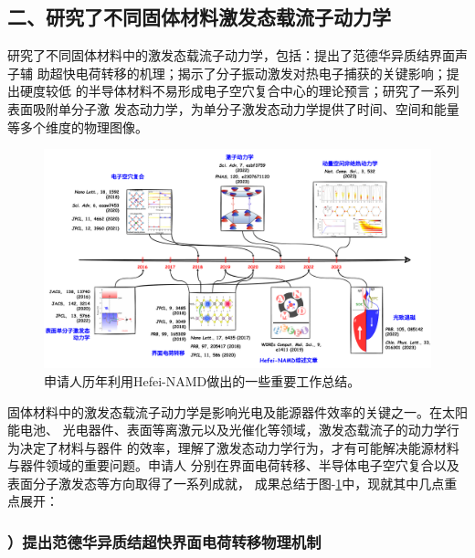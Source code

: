 \subsection*{二、研究了不同固体材料激发态载流子动力学}
\begin{center}
  \begin{InnovationBox}
    研究了不同固体材料中的激发态载流子动力学，包括：提出了范德华异质结界面声子辅
    助超快电荷转移的机理；揭示了分子振动激发对热电子捕获的关键影响；提出硬度较低
    的半导体材料不易形成电子空穴复合中心的理论预言；研究了一系列表面吸附单分子激
    发态动力学，为单分子激发态动力学提供了时间、空间和能量等多个维度的物理图像。
  \end{InnovationBox}
\end{center}

\begin{figure}
  \centering
  \includegraphics[width=1.\linewidth]{figs/rep_work.pdf}
  \caption{\label{fig:fig_rep_work}
    \kaishu{}\footnotesize
    申请人历年利用Hefei-NAMD做出的一些重要工作总结。
  }
\end{figure}


固体材料中的激发态载流子动力学是影响光电及能源器件效率的关键之一。在太阳能电池、
光电器件、表面等离激元以及光催化等领域，激发态载流子的动力学行为决定了材料与器件
的效率，理解了激发态动力学行为，才有可能解决能源材料与器件领域的重要问题。申请人
分别在界面电荷转移、半导体电子空穴复合以及表面分子激发态等方向取得了一系列成就，
成果总结于图-\ref{fig:fig_rep_work}中，现就其中几点重点展开：

\subsubsection*{）提出范德华异质结超快界面电荷转移物理机制}

